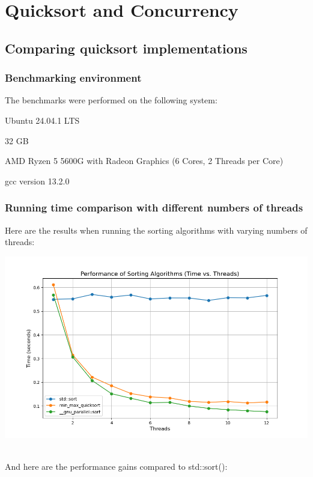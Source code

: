\documentclass[../../main.tex]{subfiles}
\begin{document}
\section{Quicksort and Concurrency}
\subsection{Comparing quicksort implementations}
\subsubsection{Benchmarking environment}
The benchmarks were performed on the following system:

\begin{description}[style=nextline, labelwidth=4.8cm, labelindent=0cm, leftmargin=5cm, font=\normalfont\bfseries]
    \item[Operating System:] Ubuntu 24.04.1 LTS
    \item[RAM:] 32 GB
    \item[CPU:] AMD Ryzen 5 5600G with Radeon Graphics (6 Cores, 2 Threads per Core)
    \item[Compiler:] gcc version 13.2.0
\end{description}


\newpage
\subsubsection{Running time comparison with different numbers of threads}
Here are the results when running the sorting algorithms with varying numbers of threads:

\includegraphics[width=\linewidth]{./running_times.png}

~\\
And here are the performance gains compared to std::sort():
\end{document}

